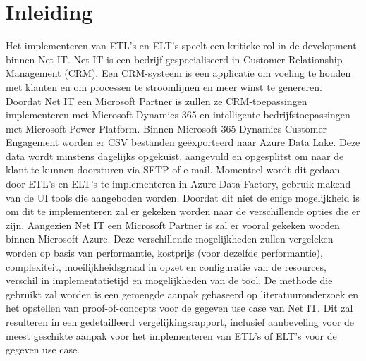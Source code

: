 


% 

\section{Inleiding}%
\label{sec:inleiding}

Het implementeren van ETL's en ELT's speelt een kritieke rol in de development binnen Net IT. Net IT is een bedrijf gespecialiseerd in Customer Relationship Management (CRM). Een CRM-systeem is een applicatie om voeling te houden met klanten en om processen te stroomlijnen en meer winst te genereren. Doordat Net IT een Microsoft Partner is zullen ze CRM-toepassingen implementeren met Microsoft Dynamics 365 en intelligente bedrijfstoepassingen met Microsoft Power Platform. Binnen Microsoft 365 Dynamics Customer Engagement worden er CSV bestanden geëxporteerd naar Azure Data Lake. Deze data wordt minstens dagelijks opgekuist, aangevuld en opgesplitst om naar de klant te kunnen doorsturen via SFTP of e-mail. Momenteel wordt dit gedaan door ETL's en ELT's te implementeren in Azure Data Factory, gebruik makend van de UI tools die aangeboden worden. Doordat dit niet de enige mogelijkheid is om dit te implementeren zal er gekeken worden naar de verschillende opties die er zijn. Aangezien Net IT een Microsoft Partner is zal er vooral gekeken worden binnen Microsoft Azure. Deze verschillende mogelijkheden zullen vergeleken worden op basis van performantie, kostprijs (voor dezelfde performantie), complexiteit, moeilijkheidsgraad in opzet en configuratie van de resources, verschil in implementatietijd en mogelijkheden van de tool. De methode die gebruikt zal worden is een gemengde aanpak gebaseerd op literatuuronderzoek en het opstellen van proof-of-concepts voor de gegeven use case van Net IT. Dit zal resulteren in een gedetailleerd vergelijkingsrapport, inclusief aanbeveling voor de meest geschikte aanpak voor het implementeren van ETL's of ELT's voor de gegeven use case.

